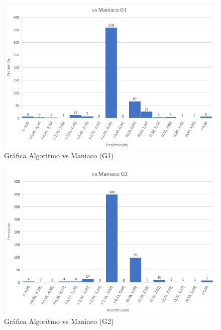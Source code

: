 \begin{figure}[h]
\centering
\includegraphics[width=1\textwidth]{figuras/AvMG1.png}   
\caption{Gráfica Algoritmo vs Maniaco (G1)}
\label{fig:AvMG1}
\end{figure}

\begin{figure}[h]
\centering
\includegraphics[width=1\textwidth]{figuras/AvMG2.png}   
\caption{Gráfica Algoritmo vs Maniaco (G2)}
\label{fig:AvMG2}
\end{figure}



